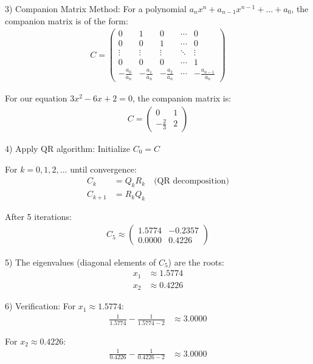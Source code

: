 \documentclass[journal]{IEEEtran}
\begin{document}
3) Companion Matrix Method:
   For a polynomial $a_nx^n+a_{n-1}x^{n-1}+\dots +a_0$, the companion matrix is of the form:
   \begin{align}
   C=
   \begin{pmatrix}
   0 & 1 & 0 & \cdots & 0 \\
   0 & 0 & 1 & \cdots & 0 \\
   \vdots & \vdots & \vdots & \ddots & \vdots \\
   0 & 0 & 0 & \cdots & 1 \\
   -\frac{a_0}{a_n} & -\frac{a_1}{a_n} & -\frac{a_2}{a_n} & \cdots & -\frac{a_{n-1}}{a_n}
   \end{pmatrix}
   \end{align}

   For our equation $3x^2 - 6x + 2 = 0$, the companion matrix is:
   \begin{align}
   C = \begin{pmatrix}
   0 & 1 \\
   -\frac{2}{3} & 2
   \end{pmatrix}
   \end{align}

4) Apply QR algorithm:
   Initialize $C_0 = C$
   
   For $k = 0, 1, 2, \ldots$ until convergence:
   \begin{align}
   C_k &= Q_kR_k \quad \text{(QR decomposition)} \\
   C_{k+1} &= R_kQ_k
   \end{align}

   After 5 iterations:
   \begin{align}
   C_5 \approx \begin{pmatrix}
   1.5774 & -0.2357 \\
   0.0000 & 0.4226
   \end{pmatrix}
   \end{align}

5) The eigenvalues (diagonal elements of $C_5$) are the roots:
   \begin{align}
   x_1 &\approx 1.5774 \\
   x_2 &\approx 0.4226
   \end{align}

6) Verification:
   For $x_1 \approx 1.5774$:
   \begin{align}
   \frac{1}{1.5774} - \frac{1}{1.5774-2} &\approx 3.0000
   \end{align}

   For $x_2 \approx 0.4226$:
   \begin{align}
   \frac{1}{0.4226} - \frac{1}{0.4226-2} &\approx 3.0000
   \end{align}
\end{document}
